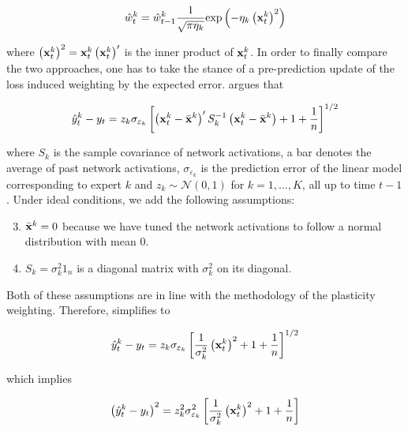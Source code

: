 \begin{equation}
    \hat w_t^k = \hat w_{t-1}^{k} \frac{1}{\sqrt{\pi\eta_k}} \text{exp}\left( -\eta_k\left({\bf x}^{k}_{t}\right)^2 \right)
\end{equation}

where $\left({\bf x}^{k}_{t}\right)^2 ={\bf x}^{k}_t\left({\bf x}^{k}_t\right)'$ is the inner product of ${\bf x}^k_t$. In order to finally compare the two approaches, one has to take the stance of a pre-prediction update of the loss induced weighting by the expected error.
\cite{Kerridge1967ErrorsOfPrediction} argues that

\begin{equation}
    \hat y_t^k - y_t  = z_k\sigma_{\varepsilon_k} \left[ \left({\bf x}_t^k - \bar {{\bf x}}^k\right)' S_k^{-1} \left({\bf x}_t^k - \bar {{\bf x}}^k\right) + 1 + \frac{1}{n} \right]^{1/2} \label{EQ:ErrorDistribution1}
\end{equation}

where $S_k$ is the sample covariance of network activations, a bar denotes the average of past network activations, $\sigma_{\varepsilon_k}$ is the prediction error of the linear model corresponding to expert $k$ and $z_k \sim \mathcal{N}(0,1)$ for $k = 1, ..., K$, all up to time $t-1$. Under ideal conditions, we add the following assumptions:

\begin{enumerate}
    \setcounter{enumi}{2}
    \item $\bar {{\bf x}}^k = 0$ because we have tuned the network activations to follow a normal distribution with mean $0$. \label{Assumption:Mean}
    \item $S_k = \sigma_k^2 1_n$ is a diagonal matrix with $\sigma_k^2$ on its diagonal. \label{Assumption:Diag}
\end{enumerate}
Both of these assumptions are in line with the methodology of the plasticity weighting. Therefore,  simplifies to

\begin{equation}
    \hat y_t^k - y_t  = z_k\sigma_{\varepsilon_k} \left[ \frac{1}{\sigma_k^{2}}\left({\bf x}_t^k\right)^2 + 1 + \frac{1}{n} \right]^{1/2} \label{EQ:ErrorDistribution2}
\end{equation}

which implies

\begin{equation}
    \left(\hat y_t^k - y_t\right)^2  = z_k^2\sigma_{\varepsilon_k}^2 \left[ \frac{1}{\sigma_k^{2}}\left({\bf x}_t^k\right)^2 + 1 + \frac{1}{n} \right]\label{EQ:ErrorDistribution3}
\end{equation}

